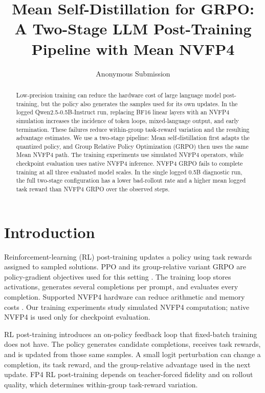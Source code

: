 \documentclass[letterpaper]{article}
\title{Mean Self-Distillation for GRPO: A Two-Stage LLM Post-Training Pipeline with Mean NVFP4}
\author{Anonymous Submission}
\begin{document}
\maketitle
\raggedbottom

\begin{abstract}
Low-precision training can reduce the hardware cost of large language model post-training, but the policy also generates the samples used for its own updates. In the logged Qwen2.5-0.5B-Instruct run, replacing BF16 linear layers with an NVFP4 simulation increases the incidence of token loops, mixed-language output, and early termination. These failures reduce within-group task-reward variation and the resulting advantage estimates. We use a two-stage pipeline: Mean self-distillation first adapts the quantized policy, and Group Relative Policy Optimization (GRPO) then uses the same Mean NVFP4 path. The training experiments use simulated NVFP4 operators, while checkpoint evaluation uses native NVFP4 inference. NVFP4 GRPO fails to complete training at all three evaluated model scales. In the single logged 0.5B diagnostic run, the full two-stage configuration has a lower bad-rollout rate and a higher mean logged task reward than NVFP4 GRPO over the observed steps.
\end{abstract}

\section{Introduction}

Reinforcement-learning (RL) post-training updates a policy using task rewards assigned to sampled solutions. PPO and its group-relative variant GRPO are policy-gradient objectives used for this setting \citep{schulman2017ppo,shao2024deepseekmath}. The training loop stores activations, generates several completions per prompt, and evaluates every completion. Supported NVFP4 hardware can reduce arithmetic and memory costs \citep{nvidia2025nvfp4,huang2025qerl}. Our training experiments study simulated NVFP4 computation; native NVFP4 is used only for checkpoint evaluation.

RL post-training introduces an on-policy feedback loop that fixed-batch training does not have. The policy generates candidate completions, receives task rewards, and is updated from those same samples. A small logit perturbation can change a completion, its task reward, and the group-relative advantage used in the next update. FP4 RL post-training depends on teacher-forced fidelity and on rollout quality, which determines within-group task-reward variation.
\end{document}
